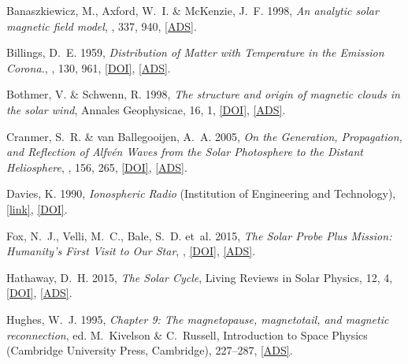 
	{Banaszkiewicz}, M., {Axford}, W.~I. \& {McKenzie}, J.~F. 1998, \emph{{An
	analytic solar magnetic field model}}, \aap, 337, 940,
	\href{http://adsabs.harvard.edu/abs/1998A%26A...337..940B}{[ADS]}.

	{Billings}, D.~E. 1959, \emph{{Distribution of Matter with Temperature in the
	Emission Corona.}}, \apj, 130, 961,
	\href{http://dx.doi.org/10.1086/146785}{[DOI]},
	\href{http://adsabs.harvard.edu/abs/1959ApJ...130..961B}{[ADS]}.

	{Bothmer}, V. \& {Schwenn}, R. 1998, \emph{{The structure and origin of magnetic clouds in the solar
	wind}}, Annales Geophysicae, 16, 1,
	\href{http://dx.doi.org/10.1007/s00585-997-0001-x}{[DOI]},
	\href{http://adsabs.harvard.edu/abs/1998AnGeo..16....1B}{[ADS]}.

	{Cranmer}, S.~R. \& {van Ballegooijen}, A.~A. 2005, \emph{{On the Generation,
	Propagation, and Reflection of Alfv{\'e}n Waves from the Solar Photosphere to
	the Distant Heliosphere}}, \apjs, 156, 265,
	\href{http://dx.doi.org/10.1086/426507}{[DOI]},
	\href{http://adsabs.harvard.edu/abs/2005ApJS..156..265C}{[ADS]}.

	Davies, K. 1990, \emph{Ionospheric Radio} (Institution of Engineering and
	Technology),
	\href{http://digital-library.theiet.org/content/books/ew/pbew031e}{[link]},
	\href{http://dx.doi.org/10.1049/PBEW031E}{[DOI]}.

	{Fox}, N.~J., {Velli}, M.~C., {Bale}, S.~D. {et~al.} 2015, \emph{{The Solar
	Probe Plus Mission: Humanity's First Visit to Our Star}}, \ssr,
	\href{http://dx.doi.org/10.1007/s11214-015-0211-6}{[DOI]},
	\href{http://adsabs.harvard.edu/abs/2015SSRv..tmp..105F}{[ADS]}.

	{Hathaway}, D.~H. 2015, \emph{{The Solar Cycle}}, Living Reviews in Solar
	Physics, 12, 4, \href{http://dx.doi.org/10.1007/lrsp-2015-4}{[DOI]},
	\href{http://adsabs.harvard.edu/abs/2015LRSP...12....4H}{[ADS]}.

	{Hughes}, W.~J. 1995, \emph{{Chapter 9: The magnetopause, magnetotail, and
	magnetic reconnection}}, ed. M.~Kivelson \& C.~Russell, Introduction to Space
	Physics (Cambridge University Press, Cambridge), 227--287,
	\href{http://adsabs.harvard.edu/abs/1995isp..book.....K}{[ADS]}.


